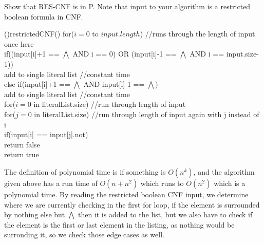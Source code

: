 \documentclass[11pt]{amsart}
\begin{document}
Show that RES-CNF is in P. Note that input to your algorithm is a restricted boolean formula in CNF.
\smallskip\\
\begin{algorithm}[H]
    \Fn(){restrictedCNF()}{
    \SetAlgoLined
    \SetNoFillComment
    \DontPrintSemicolon
    for($i = 0$ to $input.length$) //runs through the length of input once here\\
        \hspace{.5cm}if((input[i]+1 == $\bigwedge $ AND i == 0) OR (input[i]-1 == $\bigwedge $ AND i == input.size-1))\\
            \hspace{1cm}add to single literal list //constant time\\
            
        \hspace{.5cm}else if(input[i]+1 == $\bigwedge $ AND input[i]-1 == $\bigwedge $)\\
            \hspace{1cm}add to single literal list //constant time\\
    for($i = 0$ in literalList.size) //run through length of input\\
        \hspace{.5cm}for($j=0$ in literalList.size) //run through length of input again with j instead of i\\
            \hspace{1cm}if(input[i] == input[j].not)\\
                \hspace{1.5cm}return false\\
    return true
    }
    \end{algorithm}
    \smallskip
    The definition of polynomial time is if something is $O(n^k)$, and the algorithm given above has a run time of $O(n+n^2)$ which runs to $O(n^2)$ which is a polynomial time. By reading the restricted boolean CNF input, we determine where we are currently checking in the first for loop, if the element is surrounded by nothing else but $\bigwedge$ then it is added to the list, but we also have to check if the element is the first or last element in the listing, as nothing would be surronding it, so we check those edge cases as well. 
    
\end{document}
